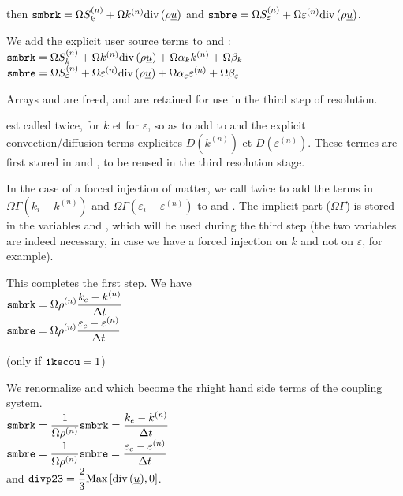 then $\text{\texttt{smbrk}}=\Omega S_k^{(n)}+\Omega k^{(n)}\text{div}\,(\rho\underline{u})$
and $\text{\texttt{smbre}}=\Omega S_\varepsilon^{(n)}+\Omega\varepsilon^{(n)}\text{div}\,(\rho\underline{u})$.


We add the explicit user source terms to  and
:\\
$\text{\texttt{smbrk}}=\Omega S_k^{(n)}+\Omega k^{(n)}\text{div}\,(\rho\underline{u})+\Omega\alpha_k k^{(n)} +\Omega\beta_k$\\
$\text{\texttt{smbre}}=\Omega S_\varepsilon^{(n)}+\Omega\varepsilon^{(n)}\text{div}\,(\rho\underline{u})
+\Omega\alpha_\varepsilon \varepsilon^{(n)} +\Omega\beta_\varepsilon$

Arrays  and  are freed,  and  are
retained for use in the third step of resolution.

 est called twice, for $k$ et for $\varepsilon$, so
as to add to  and  the explicit convection/diffusion terms
explicites $D(k^{(n)})$ et $D(\varepsilon^{(n)})$. These termes are first
stored in  and , to be reused in the third resolution stage.

In the case of a forced injection of matter, we call 
twice to add the terms in
$\Omega \Gamma (k_i-k^{(n)})$ and
$\Omega \Gamma (\varepsilon_i-\varepsilon^{(n)})$ to  and
. The implicit part ($\Omega\Gamma$) is stored in the
variables  and , which will be used during the third
step (the two variables are indeed necessary, in case we have a
forced injection on $k$ and not on $\varepsilon$, for example).

This completes the first step. We have\\
$\displaystyle \text{\texttt{smbrk}}=\Omega \rho^{(n)}\frac{k_e-k^{(n)}}{\Delta t}$\\
$\displaystyle \text{\texttt{smbre}}=\Omega \rho^{(n)}\frac{\varepsilon_e-\varepsilon^{(n)}}{\Delta t}$

(only if $\text{\texttt{ikecou}}=1$)

We renormalize  and  which become the rhight hand side terms of the
coupling system.\\
$\displaystyle \text{\texttt{smbrk}}=\frac{1}{\Omega\rho^{(n)}}\text{\texttt{smbrk}}
=\frac{k_e-k^{(n)}}{\Delta t}$\\
$\displaystyle \text{\texttt{smbre}}=\frac{1}{\Omega\rho^{(n)}}\text{\texttt{smbre}}
=\frac{\varepsilon_e-\varepsilon^{(n)}}{\Delta t}$\\
and $\displaystyle \text{\texttt{divp23}}=\frac{2}{3}\text{Max}\left[\text{div}\,(\underline{u}),0\right]$.

